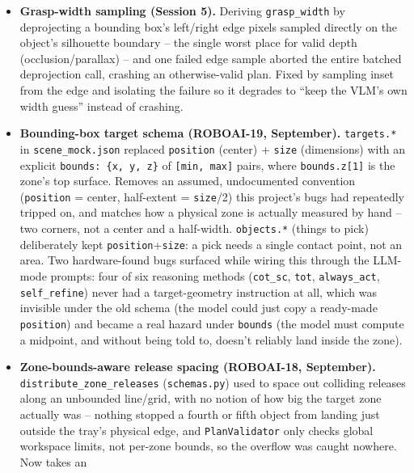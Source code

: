 \begin{itemize}[nosep]
    registered center point) and nudges only positions that drifted into a
    zone without exactly echoing a registered target/stacking position
    (to avoid re-nudging a deliberate stack or placement).
  \item \textbf{Grasp-width sampling (Session 5).} Deriving \texttt{grasp\_width}
    by deprojecting a bounding box's left/right edge pixels sampled directly
    on the object's silhouette boundary -- the single worst place for valid
    depth (occlusion/parallax) -- and one failed edge sample aborted the
    entire batched deprojection call, crashing an otherwise-valid plan.
    Fixed by sampling inset from the edge and isolating the failure so it
    degrades to ``keep the VLM's own width guess'' instead of crashing.
  \item \textbf{Bounding-box target schema (ROBOAI-19, September).}
    \texttt{targets.*} in \texttt{scene\_mock.json} replaced
    \texttt{position} (center) + \texttt{size} (dimensions) with an explicit
    \texttt{bounds: \{x, y, z\}} of \texttt{[min, max]} pairs, where
    \texttt{bounds.z[1]} is the zone's top surface. Removes an assumed,
    undocumented convention (\texttt{position} = center, half-extent =
    \texttt{size}/2) this project's bugs had repeatedly tripped on, and
    matches how a physical zone is actually measured by hand -- two
    corners, not a center and a half-width. \texttt{objects.*} (things to
    pick) deliberately kept \texttt{position}+\texttt{size}: a pick needs a
    single contact point, not an area. Two hardware-found bugs surfaced
    while wiring this through the LLM-mode prompts: four of six reasoning
    methods (\texttt{cot\_sc}, \texttt{tot}, \texttt{always\_act},
    \texttt{self\_refine}) never had a target-geometry instruction at all,
    which was invisible under the old schema (the model could just copy a
    ready-made \texttt{position}) and became a real hazard under
    \texttt{bounds} (the model must compute a midpoint, and without being
    told to, doesn't reliably land inside the zone).
  \item \textbf{Zone-bounds-aware release spacing (ROBOAI-18, September).}
    \texttt{distribute\_zone\_releases} (\texttt{schemas.py}) used to space
    out colliding releases along an unbounded line/grid, with no notion of
    how big the target zone actually was -- nothing stopped a fourth or
    fifth object from landing just outside the tray's physical edge, and
    \texttt{PlanValidator} only checks global workspace limits, not
    per-zone bounds, so the overflow was caught nowhere. Now takes an

\end{itemize}
